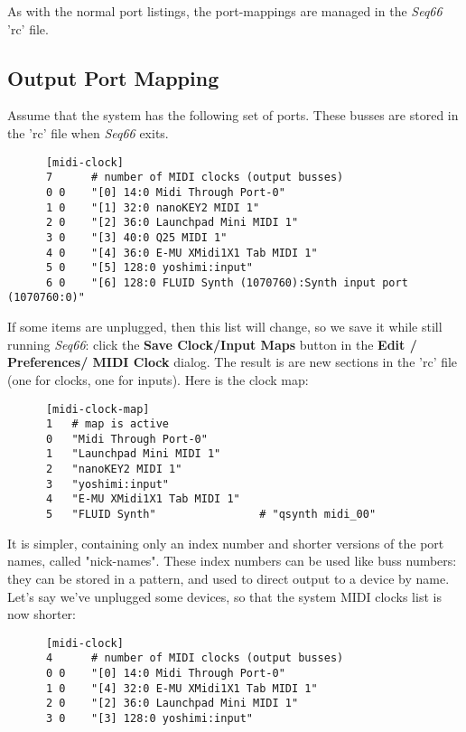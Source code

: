    As with the normal port listings, the port-mappings are managed in the
   \textsl{Seq66} 'rc' file.

\subsection{Output Port Mapping}
\label{subsec:output_port_mapping}

   Assume that the system has the following set of ports.  These busses are
   stored in the 'rc' file when \textsl{Seq66} exits.

   \begin{verbatim}
      [midi-clock]
      7      # number of MIDI clocks (output busses)
      0 0    "[0] 14:0 Midi Through Port-0"
      1 0    "[1] 32:0 nanoKEY2 MIDI 1"
      2 0    "[2] 36:0 Launchpad Mini MIDI 1"
      3 0    "[3] 40:0 Q25 MIDI 1"
      4 0    "[4] 36:0 E-MU XMidi1X1 Tab MIDI 1"
      5 0    "[5] 128:0 yoshimi:input"
      6 0    "[6] 128:0 FLUID Synth (1070760):Synth input port (1070760:0)"
   \end{verbatim}

   If some items are unplugged, then this list will change, so we save it while
   still running \textsl{Seq66}:
   click the
   \textbf{Save Clock/Input Maps} button in the
   \textbf{Edit / Preferences/ MIDI Clock} dialog. 
   The result is are new sections in the 'rc' file (one for clocks, one for
   inputs).  Here is the clock map:

   \begin{verbatim}
      [midi-clock-map]
      1   # map is active
      0   "Midi Through Port-0"
      1   "Launchpad Mini MIDI 1"
      2   "nanoKEY2 MIDI 1"
      3   "yoshimi:input"
      4   "E-MU XMidi1X1 Tab MIDI 1"
      5   "FLUID Synth"                # "qsynth midi_00"
   \end{verbatim}
   
   It is simpler, containing only an index number and shorter versions of the
   port names, called "nick-names".  These index numbers can be used like buss
   numbers: they can be stored in a pattern, and used to direct output to a
   device by name.  Let's say we've unplugged some devices, so that the system
   MIDI clocks list is now shorter:

   \begin{verbatim}
      [midi-clock]
      4      # number of MIDI clocks (output busses)
      0 0    "[0] 14:0 Midi Through Port-0"
      1 0    "[4] 32:0 E-MU XMidi1X1 Tab MIDI 1"
      2 0    "[2] 36:0 Launchpad Mini MIDI 1"
      3 0    "[3] 128:0 yoshimi:input"
   \end{verbatim}

